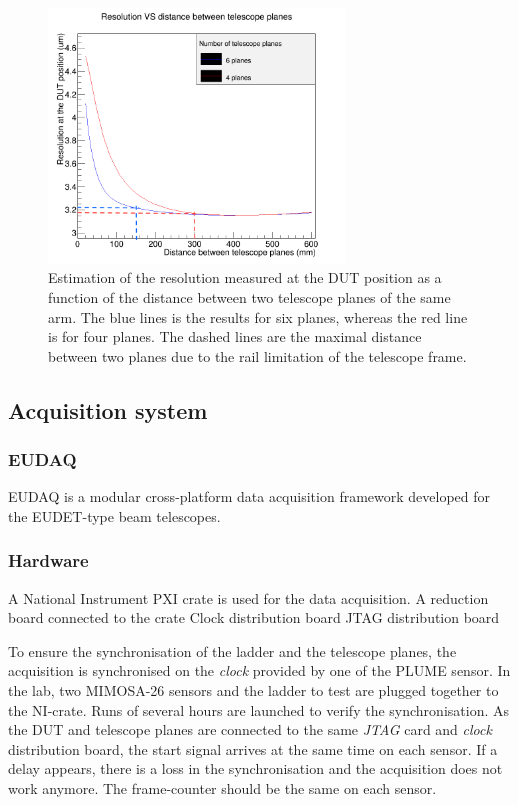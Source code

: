     \begin{figure}
      \centering
      \includegraphics[width = 0.7\textwidth]{Pictures/X0/resolution_4Vs6planes_4-7GeV.png}
      \caption{Estimation of the resolution measured at the DUT position as a function of the distance between two telescope planes of the same arm.
      The blue lines is the results for six planes, whereas the red line is for four planes. 
      The dashed lines are the maximal distance between two planes due to the rail limitation of the telescope frame.}
      \label{fig:estimationRes4.7GeV}
    \end{figure}

    \subsection{Acquisition system}
      
      \subsubsection{EUDAQ}

      EUDAQ is a modular cross-platform data acquisition framework developed for the EUDET-type beam telescopes.

      \subsubsection{Hardware}

      A National Instrument PXI crate is used for the data acquisition. 
      A reduction board connected to the crate
      Clock distribution board
      JTAG distribution board

    To ensure the synchronisation of the ladder and the telescope planes, the acquisition is synchronised on the \textit{clock} provided by one of the \gls{PLUME} sensor.
    In the lab, two MIMOSA-26 sensors and the ladder to test are plugged together to the NI-crate. 
    Runs of several hours are launched to verify the synchronisation.
    As the \gls{DUT} and telescope planes are connected to the same \textit{JTAG} card and \textit{clock} distribution board, the start signal arrives at the same time on each sensor.
    If a delay appears, there is a loss in the synchronisation and the acquisition does not work anymore.
    The frame-counter should be the same on each sensor.

